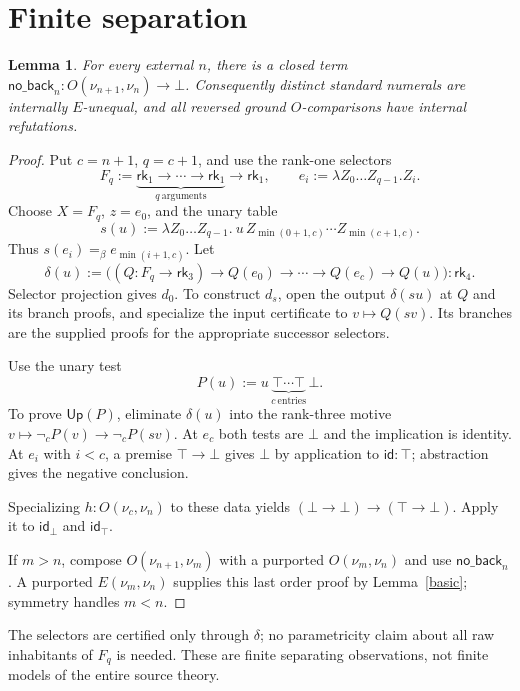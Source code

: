 \documentclass[11pt,a4paper]{article}
\newcommand{\rk}[1]{\mathsf{rk}_{#1}}
\newcommand{\nc}{\mathop{\neg}\nolimits_c}
\newcommand{\Up}{\mathsf{Up}}
\newtheorem{lemma}{Lemma}
\theoremstyle{remark}\newtheorem*{remark}{Remark}
\begin{document}
\section{Finite separation}\label{sec:separation}
\begin{lemma}\label{sep}
For every external $n$, there is a closed term
$\mathsf{no\_back}_n:O(\nu_{n+1},\nu_n)\to\bot$.
Consequently distinct standard numerals are internally $E$-unequal, and
all reversed ground $O$-comparisons have internal refutations.
\end{lemma}
\begin{proof}
Put $c=n+1$, $q=c+1$, and use the rank-one selectors
\[
 F_q:=\underbrace{\rk1\to\cdots\to\rk1}_{q\ \mathrm{arguments}}
           \to\rk1,\qquad
 e_i:=\lambda Z_0\ldots Z_{q-1}.Z_i.
\]
Choose $X=F_q$, $z=e_0$, and the unary table
\[
 s(u):=\lambda Z_0\ldots Z_{q-1}.\
 u\,Z_{\min(0+1,c)}\cdots Z_{\min(c+1,c)}.
\]
Thus $s(e_i)=_\beta e_{\min(i+1,c)}$. Let
\[
 \delta(u):=\bigl((Q:F_q\to\rk3)\to
 Q(e_0)\to\cdots\to Q(e_c)\to Q(u)\bigr):\rk4.
\]
Selector projection gives $d_0$. To construct $d_s$, open the output
$\delta(su)$ at $Q$ and its branch proofs, and specialize the input
certificate to $v\mapsto Q(sv)$. Its branches are the supplied proofs for
the appropriate successor selectors.

Use the unary test
\[
 P(u):=u\,\underbrace{\top\cdots\top}_{c\ \mathrm{entries}}\,\bot.
\]
To prove $\Up(P)$, eliminate $\delta(u)$ into the rank-three motive
$v\mapsto\nc P(v)\to\nc P(sv)$. At $e_c$ both tests are $\bot$ and the
implication is identity. At $e_i$ with $i<c$, a premise
$\top\to\bot$ gives $\bot$ by application to $\mathsf{id}:\top$; abstraction
gives the negative conclusion. 

Specializing $h:O(\nu_c,\nu_n)$ to these data yields
$(\bot\to\bot)\to(\top\to\bot)$. Apply it to $\mathsf{id}_{\bot}$ and
$\mathsf{id}_{\top}$.

If $m>n$, compose $O(\nu_{n+1},\nu_m)$ with a purported
$O(\nu_m,\nu_n)$ and use $\mathsf{no\_back}_n$.
A purported $E(\nu_m,\nu_n)$ supplies this last order proof by
Lemma~\ref{basic}; symmetry handles $m<n$.
\end{proof}
The selectors are certified only through $\delta$; no parametricity claim
about all raw inhabitants of $F_q$ is needed. These are finite separating
observations, not finite models of the entire source theory.
\end{document}
